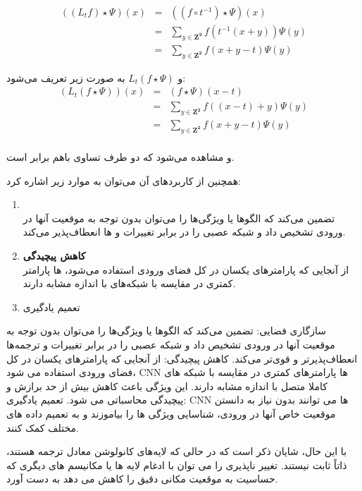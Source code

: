 \begin{qsolve}
	\begin{eqnarray*}
		((L_tf)\star \Psi)(x)&=&((f\circ t^{-1})\star \Psi)(x)\\
		&=&\sum_{y\in \mathbf{Z^2}} f(t^{-1} (x+y))\Psi(y)\\
		&=&\sum_{y\in \mathbf{Z^2}} f(x+y-t)\Psi(y)
	\end{eqnarray*}
	
	و $L_t(f\star \Psi)$ به صورت زیر تعریف می‌شود:
	\begin{eqnarray*}
		(L_t(f \star \Psi))(x)&=&(f\star \Psi)(x-t)\\
		&=&\sum_{y\in \mathbf{Z^2}} f((x-t)+y)\Psi(y)\\
		&=&\sum_{y\in \mathbf{Z^2}} f(x+y-t)\Psi(y)\\
	\end{eqnarray*}
	
	و مشاهده می‌شود که دو طرف تساوی باهم برابر است.
	
	همچنین از کاربردهای آن می‌توان به موارد زیر اشاره کرد:
	
	\begin{enumerate}
		\item {}\\
		تضمین می‌کند که الگوها یا ویژگی‌ها را می‌توان بدون توجه به موقعیت آنها در ورودی تشخیص داد و شبکه عصبی را در برابر تغییرات و  ها انعطاف‌پذیر می‌کند.
		
		
		\item \textbf{کاهش پیچیدگی}\\
		از آنجایی که پارامتر‌های یکسان در کل فضای ورودی استفاده می‌شود،  ها پارامتر کمتری در مقایسه با شبکه‌های  با اندازه مشابه دارند.
		
		\item تعمیم یادگیری
	\end{enumerate}
	
	
	
	  سازگاری فضایی: تضمین می‌کند که الگوها یا ویژگی‌ها را می‌توان بدون توجه به موقعیت آنها در ورودی تشخیص داد و شبکه عصبی را در برابر تغییرات و ترجمه‌ها انعطاف‌پذیرتر و قوی‌تر می‌کند.
	کاهش پیچیدگی: از آنجایی که پارامترهای یکسان در کل فضای ورودی استفاده می شود، CNN ها پارامترهای کمتری در مقایسه با شبکه های کاملا متصل با اندازه مشابه دارند. این ویژگی باعث کاهش بیش از حد برازش و پیچیدگی محاسباتی می شود.
	تعمیم یادگیری: CNN ها می توانند بدون نیاز به دانستن موقعیت خاص آنها در ورودی، شناسایی ویژگی ها را بیاموزند و به تعمیم داده های مختلف کمک کنند.
	
	با این حال، شایان ذکر است که در حالی که لایه‌های کانولوشن معادل ترجمه هستند، ذاتاً ثابت نیستند. تغییر ناپذیری را می توان با ادغام لایه ها یا مکانیسم های دیگری که حساسیت به موقعیت مکانی دقیق را کاهش می دهد به دست آورد.
	
	
	
	
	
\end{qsolve}





